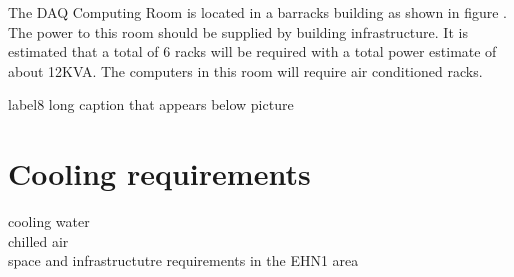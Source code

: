 The DAQ Computing Room is located in a barracks building as shown in figure .  The power to this room should be supplied by building infrastructure.  It is estimated that a total of 6 racks will be required with a total power estimate of about 12KVA.  The computers in this room will require air conditioned racks.
%
\begin{cdrfigure}{label}{8 long caption that appears below picture}
\end{cdrfigure}
%


\section{Cooling requirements}
cooling water \\
chilled air\\



space and infrastructutre requirements in the EHN1 area

